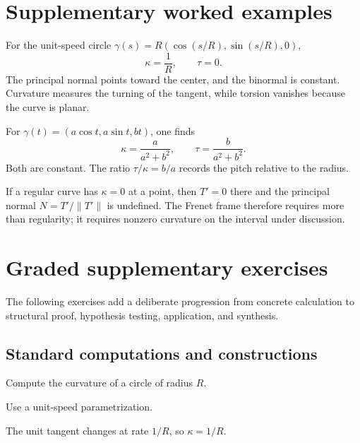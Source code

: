 \section{Supplementary worked examples}
\label{sec:vii13-pedagogy}

\begin{example}\label{ex:vii13-ped-01}
For the unit-speed circle \(\gamma(s)=R(\cos(s/R),\sin(s/R),0)\),
\[
\kappa=\frac1R,\qquad \tau=0.
\]
The principal normal points toward the center, and the binormal is constant.  Curvature measures the turning of the tangent, while torsion vanishes because the curve is planar.
\end{example}

\begin{example}\label{ex:vii13-ped-02}
For \(\gamma(t)=(a\cos t,a\sin t,bt)\), one finds
\[
\kappa=\frac{a}{a^2+b^2},\qquad
\tau=\frac{b}{a^2+b^2}.
\]
Both are constant.  The ratio \(\tau/\kappa=b/a\) records the pitch relative to the radius.
\end{example}

\begin{example}\label{ex:vii13-ped-03}
If a regular curve has \(\kappa=0\) at a point, then \(T'=0\) there and the principal normal \(N=T'/\|T'\|\) is undefined.  The Frenet frame therefore requires more than regularity; it requires nonzero curvature on the interval under discussion.
\end{example}

\section{Graded supplementary exercises}
The following exercises add a deliberate progression from concrete calculation to structural proof, hypothesis testing, application, and synthesis.

\subsection*{Standard computations and constructions}

\begin{exercise}\label{exr:vii13-ped-01}
Compute the curvature of a circle of radius \(R\).
\end{exercise}
\begin{hint}
Use a unit-speed parametrization.
\end{hint}
\begin{solution}
The unit tangent changes at rate \(1/R\), so \(\kappa=1/R\).
\end{solution}

